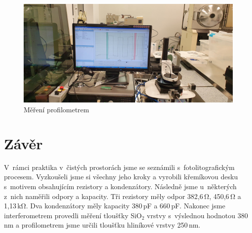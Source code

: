 \documentclass[a4paper,12pt]{article}
\begin{document}
\begin{figure}[h!]
	\centering
	\includegraphics[width=130mm]{10profilometr.jpg}
	\caption{Měření profilometrem}
	\label{10profilometr}
\end{figure}

\section{Závěr}
V~rámci praktika v~čistých prostorách jsme se seznámili s~fotolitografickým 
procesem. Vyzkoušeli jsme si všechny jeho kroky a vyrobili křemíkovou desku
s~motivem obsahujícím rezistory a kondenzátory. Následně jsme u~některých z~nich 
naměřili odpory a kapacity. Tři rezistory měly odpor 382,6\,\si{\ohm}, 
450,6\,\si{\ohm} a 1,13\,\si{\kilo\ohm}. Dva kondenzátory měly kapacity 
380\,\si{\pico\farad} a 660\,\si{\pico\farad}. Nakonec jsme interferometrem 
provedli 
měření tloušťky SiO$_2$ vrstvy s~výslednou hodnotou 380\,\si{\nano\meter} a 
profilometrem jsme určili tloušťku hliníkové vrstvy  250\,\si{\nano\meter}.
\end{document}
